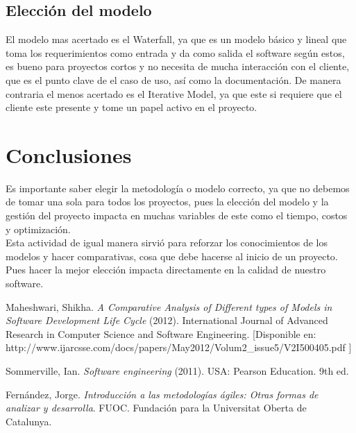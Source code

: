 \documentclass[spanish,12pt,letterpapper]{article}
\begin{document}
   \subsection{Elección del modelo}
   El modelo mas acertado es el Waterfall, ya que es un modelo básico y lineal que toma los requerimientos como entrada y da como salida el software según estos, es bueno para proyectos cortos y no necesita de mucha interacción con el cliente, que es el punto clave de el caso de uso, así como la documentación. De manera contraria el menos acertado es el Iterative Model, ya que este si requiere que el cliente este presente y tome un papel activo en el proyecto.
   
   \section{Conclusiones}
   Es importante saber elegir la metodología o modelo correcto, ya que no debemos de tomar una sola para todos los proyectos, pues la elección del modelo y la gestión del proyecto impacta en muchas variables de este como el tiempo, costos y optimización.\\
   
   Esta actividad de igual manera sirvió para reforzar los conocimientos de los modelos y hacer comparativas, cosa que debe hacerse al inicio de un proyecto. Pues hacer la mejor elección impacta directamente en la calidad de nuestro software.

	
	\pagebreak
	\begin{thebibliography}{9}
	  Maheshwari, Shikha. 
		\emph{A Comparative Analysis of Different types of Models in Software Development Life Cycle} (2012). International Journal of Advanced Research in Computer Science and Software Engineering. [Disponible en: http://www.ijarcsse.com/docs/papers/May2012/Volum2\_issue5/V2I500405.pdf ]
		
		  Sommerville, Ian. 
		\emph{Software engineering} (2011). USA:  Pearson Education. 9th ed. 
		
		  Fernández, Jorge. 
		\emph{Introducción a las metodologías ágiles: Otras formas de analizar y desarrolla}. FUOC. Fundación para la Universitat Oberta de Catalunya. 
		
	\end{thebibliography}
	
\end{document}
